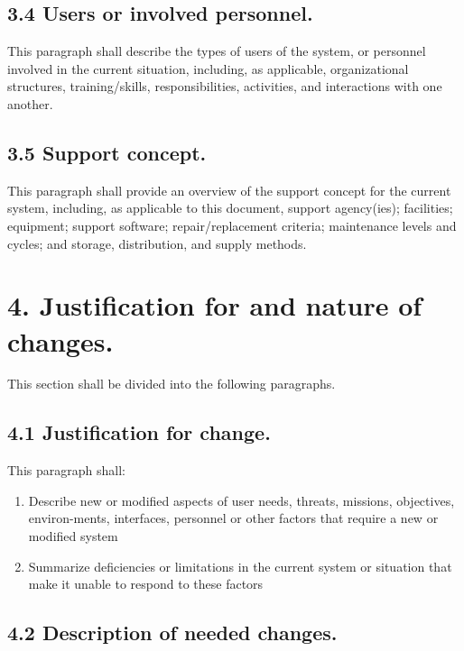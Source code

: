 \subsection{3.4 Users or involved personnel.}

This paragraph shall describe the types of users of the system, or
personnel involved in the current situation, including, as applicable,
organizational structures, training/skills, responsibilities,
activities, and interactions with one another.

\subsection{3.5 Support concept.}

This paragraph shall provide an overview of the support concept for the
current system, including, as applicable to this document, support
agency(ies); facilities; equipment; support software; repair/replacement
criteria; maintenance levels and cycles; and storage, distribution, and
supply methods.

\section{4. Justification for and nature of changes.}

This section shall be divided into the following paragraphs.

\subsection{4.1 Justification for change.}

This paragraph shall:

\begin{enumerate}
\itemsep1pt\parskip0pt
\item
  Describe new or modified aspects of user needs, threats, missions,
  objectives, environ-ments, interfaces, personnel or other factors that
  require a new or modified system
\item
  Summarize deficiencies or limitations in the current system or
  situation that make it unable to respond to these factors
\end{enumerate}

\subsection{4.2 Description of needed changes.}

